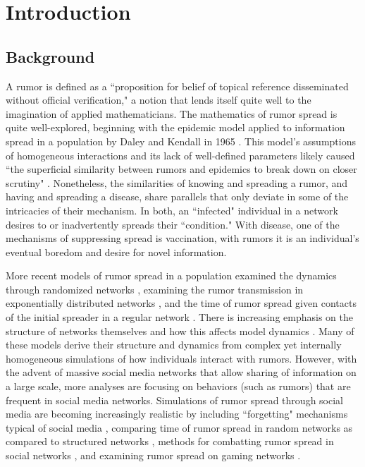\section{Introduction }
\label{sec:introduction}

\subsection{Background}
\label{subsec:background}

A rumor is defined as a ``proposition for belief of topical reference disseminated without official verification," \cite{knapp-1944} a notion that lends itself quite well to the imagination of applied mathematicians. The mathematics of rumor spread is quite well-explored, beginning with the epidemic model applied to information spread in a population by Daley and Kendall in 1965 \cite{daley-1965}. This model's assumptions of homogeneous interactions and its lack of well-defined parameters likely caused ``the superficial similarity between rumors and epidemics to break down on closer scrutiny" \cite{daley-1965}. Nonetheless, the similarities of knowing and spreading a rumor, and having and spreading a disease, share parallels that only deviate in some of the intricacies of their mechanism. In both, an ``infected" individual in a network desires to or inadvertently spreads their ``condition." With disease, one of the mechanisms of suppressing spread is vaccination, with rumors it is an individual's eventual boredom and desire for novel information.

More recent models of rumor spread in a population examined the dynamics through randomized networks \cite{karp-2000}, examining the rumor transmission in exponentially distributed networks \cite{moreno-2004}, and the time of rumor spread given contacts of the initial spreader in a regular network \cite{fount-2010}. There is increasing emphasis on the structure of networks themselves and how this affects model dynamics \cite{zhang-2013, pellis-2015, pellis-2012, ball-2010, zhou-2007}. Many of these models derive their structure and dynamics from complex yet internally homogeneous simulations of how individuals interact with rumors. However, with the advent of massive social media networks that allow sharing of information on a large scale, more analyses are focusing on behaviors (such as rumors) that are frequent in social media networks. Simulations of rumor spread through social media are becoming increasingly realistic by including ``forgetting" mechanisms typical of social media \cite{zhao-2011}, comparing time of rumor spread in random networks as compared to structured networks \cite{liu-2011}, methods for combatting rumor spread in social networks \cite{tripathy-2010}, and examining rumor spread on gaming networks \cite{grab-2008}.

